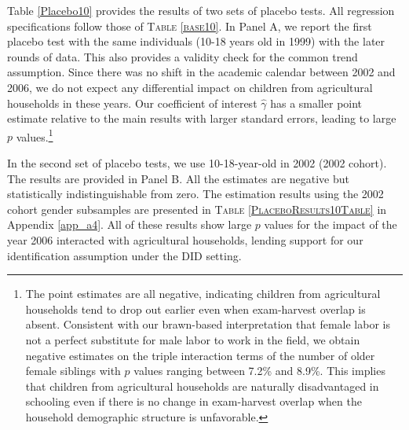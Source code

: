 \documentclass[12pt,letterpaper]{article}
\newcommand{\0}{\ensuremath{\mbox{\boldmath $0$}}}
\begin{document}
Table \ref{Placebo10} provides the results of two sets of placebo tests. All regression specifications follow those of \textsc{Table \ref{base10}}.
In Panel A, we report the first placebo test with the same individuals (10-18 years old in 1999) with the later rounds of data. This also provides a validity check for the common trend assumption. Since there was no shift in the academic calendar between 2002 and 2006, we do not expect any differential impact on children from agricultural households in these years. Our coefficient of interest $\hat{\gamma}$ has a smaller point estimate relative to the main results with larger standard errors, leading to large $p$ values.\footnote{The point estimates are all negative, indicating children from agricultural households tend to drop out earlier even when exam-harvest overlap is absent. Consistent with our brawn-based interpretation that female labor is not a perfect substitute for male labor to work in the field, we obtain negative estimates on the triple interaction terms of the number of older female siblings with $p$ values ranging between 7.2\% and 8.9\%. This implies that children from agricultural households are naturally disadvantaged in schooling even if there is no change in exam-harvest overlap when the household demographic structure is unfavorable.}

In the second set of placebo tests, we use 10-18-year-old in 2002 (2002 cohort). The results are provided in Panel B. All the estimates are negative but statistically indistinguishable from zero. The estimation results using the 2002 cohort gender subsamples are presented in \textsc{Table \ref{PlaceboResults10Table}} in Appendix \ref{app_a4}. All of these results show large $p$ values for the impact of the year 2006 interacted with agricultural households, lending support for our identification assumption under the DID setting.
\end{document}
